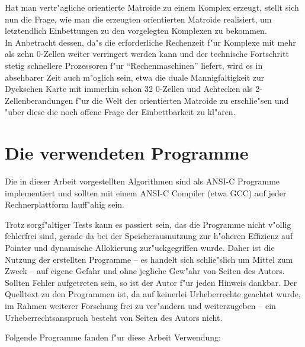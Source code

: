 Hat man vertr"agliche orientierte Matroide zu einem Komplex erzeugt,
stellt sich nun die Frage, wie man die erzeugten orientierten Matroide
realisiert, um letztendlich Einbettungen zu den vorgelegten Komplexen zu
bekommen.\\
In Anbetracht dessen, da"s die erforderliche Rechenzeit f"ur Komplexe mit mehr
als zehn 0-Zellen weiter verringert werden kann und der technische
Fortschritt stetig schnellere Prozessoren f"ur "`Rechenmaschinen"' liefert,
wird es in absehbarer Zeit auch m"oglich sein, etwa die duale
Mannigfaltigkeit zur Dyckschen Karte mit immerhin schon 32 0-Zellen und
Achtecken als 2-Zellenberandungen f"ur die Welt der orientierten Matroide zu
erschlie"sen und "uber diese die noch offene Frage der Einbettbarkeit zu
kl"aren.

\section{Die verwendeten Programme}

Die in dieser Arbeit vorgestellten Algorithmen sind als ANSI-C Programme
implementiert und sollten mit einem ANSI-C Compiler (etwa GCC) auf jeder
Rechnerplattform lauff"ahig sein.

Trotz sorgf"altiger Tests kann es passiert sein, das die Programme nicht
v"ollig fehlerfrei sind, gerade da bei der Speicherausnutzung zur h"oheren
Effizienz auf Pointer und dynamische Allokierung zur"uckgegriffen wurde.
Daher ist die Nutzung der erstellten Programme -- es handelt sich
schlie"slich um Mittel zum Zweck -- auf eigene Gefahr und ohne jegliche
Gew"ahr von Seiten des Autors. Sollten Fehler aufgetreten sein, so ist
der Autor f"ur jeden Hinweis dankbar. Der Quelltext zu den Programmen
ist, da auf keinerlei Urheberrechte geachtet wurde, im Rahmen weiterer
Forschung frei zu ver"andern und weiterzugeben -- ein Urheberrechtsanspruch
besteht von Seiten des Autors nicht.

Folgende Programme fanden f"ur diese Arbeit Verwendung:

